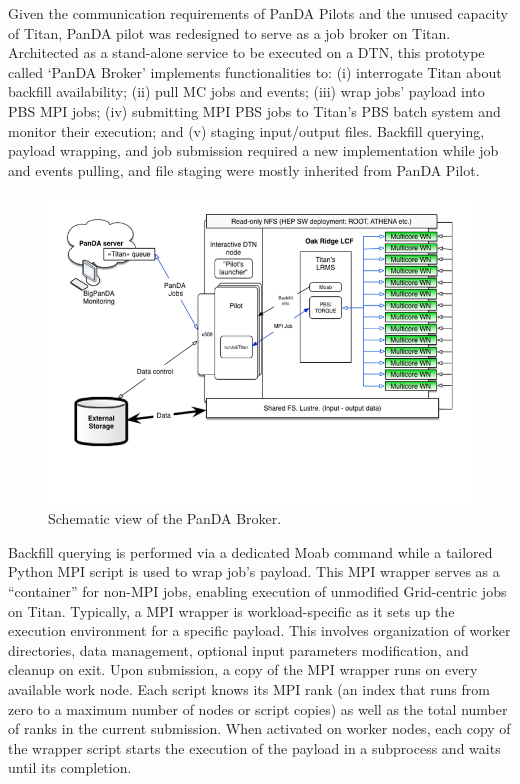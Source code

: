 Given the communication requirements of PanDA Pilots and the unused capacity of
Titan, PanDA pilot was redesigned to serve as a job broker on Titan. Architected
as a stand-alone service to be executed on a DTN, this prototype called `PanDA
Broker' implements functionalities to: (i) interrogate Titan about backfill
availability; (ii) pull MC jobs and events; (iii) wrap jobs' payload into PBS
MPI jobs; (iv) submitting MPI PBS jobs to Titan's PBS batch system and monitor
their execution; and (v) staging input/output files. Backfill querying,
payload wrapping, and job submission required a new implementation while job and
events pulling, and file staging were mostly inherited from PanDA Pilot.

\begin{figure}
  \begin{center}
    \includegraphics[width=\columnwidth]{figures/PanDA_setup_at_OLCF.png}
    \caption{Schematic view of the PanDA Broker.}
  \end{center}
\label{fig:panda_broker}
\end{figure}

Backfill querying is performed via a dedicated Moab command while a tailored
Python MPI script is used to wrap job's payload. This MPI wrapper serves as a
``container'' for non-MPI jobs, enabling execution of unmodified Grid-centric
jobs on Titan. Typically, a MPI wrapper is workload-specific as it sets up the
execution environment for a specific payload. This involves organization of
worker directories, data management, optional input parameters modification, and
cleanup on exit. Upon submission, a copy of the MPI wrapper runs on every
available work node. Each script knows its MPI rank (an index that runs from
zero to a maximum number of nodes or script copies) as well as the total number
of ranks in the current submission. When activated on worker nodes, each copy of
the wrapper script starts the execution of the payload in a subprocess and waits
until its completion.


